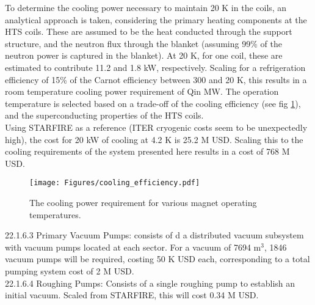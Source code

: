 To determine the cooling power necessary to maintain 20 K in the coils, an analytical approach is taken, considering the primary heating components at the HTS coils. These are assumed to be the heat conducted through the support structure, and the neutron flux through the blanket (assuming 99\% of the neutron power is captured in the blanket). At 20 K, for one coil, these are estimated to contribute 11.2 and 1.8 kW, respectively. Scaling for a refrigeration efficiency of 15\% of the Carnot efficiency between 300 and 20 K, this results in a room temperature cooling power requirement of Qin MW. The operation temperature is selected based on a trade-off of the cooling efficiency (see fig \ref{fig:cool_eff}), and the superconducting properties of the HTS coils.\\

Using STARFIRE as a reference (ITER cryogenic costs seem to be unexpectedly high), the cost for 20 kW of cooling at 4.2 K is 25.2 M USD. Scaling this to the cooling requirements of the system presented here results in a cost of 768 M USD. \\

\begin{figure}[h]
    \centering
    \texttt{[image: Figures/cooling\_efficiency.pdf]}
    \caption{The cooling power requirement for various magnet operating temperatures.}
    \label{fig:cool_eff}
\end{figure}



22.1.6.3 Primary Vacuum Pumps: consists of d a distributed vacuum subsystem with vacuum pumps located at each sector. For a vacuum of 7694 m$^3$, 1846 vacuum pumps will be required, costing 50 K USD each, corresponding to a total pumping system cost of 2 M USD.\\

22.1.6.4 Roughing Pumps: Consists of a single roughing pump to establish an initial vacuum. Scaled from STARFIRE, this will cost 0.34 M USD.


